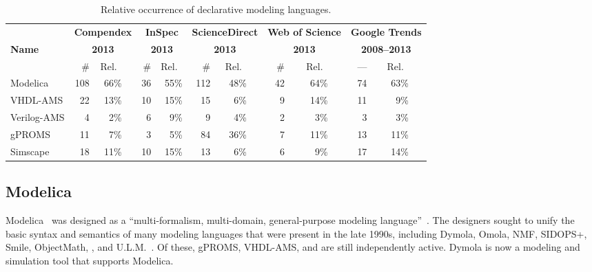 \captionsetup[table]{textformat=simple}
\begin{table}[hbtp]
  \caption[Relative occurrence of declarative modeling languages]{Relative occurrence of declarative modeling languages.\footnotemark}
  \label{tab:Languages}
  \begin{tabular}{l rrr rr rrr rrr rrr}
    \toprule
     & \multicolumn{3}{c}{\textbf{Compendex}} & \multicolumn{2}{c}{\textbf{InSpec}} & \multicolumn{3}{c}{\textbf{ScienceDirect}} & \multicolumn{3}{c}{\textbf{Web of Science}} & \multicolumn{3}{c}{\textbf{Google Trends}} \\
    \textbf{Name} & \multicolumn{3}{c}{\textbf{2013}} & \multicolumn{2}{c}{\textbf{2013}} & \multicolumn{3}{c}{\textbf{2013}} & \multicolumn{3}{c}{\textbf{2013}} & \multicolumn{3}{c}{\textbf{2008--2013}} \\
    \cmidrule(lr){2-4} \cmidrule(lr){5-6} \cmidrule(lr){7-9} \cmidrule(lr){10-12} \cmidrule(lr){13-15}
    & \# & Rel.\ && \# & Rel.\ & \# & Rel.\ && \# & Rel.\ && --- & Rel.\ \\
    \midrule
    Modelica & 108 & 66\% && 36 & 55\% & 112 & 48\% && 42 & 64\% && 74 & 63\% \\
    VHDL-AMS & 22 & 13\% && 10 & 15\% & 15 & 6\% && 9 & 14\% && 11 & 9\% \\
    Verilog-AMS & 4 & 2\% && 6 & 9\% & 9 & 4\% && 2 & 3\% && 3 & 3\% \\
    gPROMS & 11 & 7\% && 3 & 5\% & 84 & 36\% && 7 & 11\% && 13 & 11\% \\
    Simscape & 18 & 11\% && 10 & 15\% & 13 & 6\% && 6 & 9\% && 17 & 14\% \\
    \bottomrule
  \end{tabular}
\end{table}
\captionsetup[table]{textformat=period}


\subsection{Modelica}

Modelica~\cite{Modelica3.3} was designed as a ``multi-formalism, multi-domain, general-purpose modeling language''~\cite{Elmqvist1997}.  The designers sought to unify the basic syntax and semantics of many modeling languages that were present in the late 1990s, including Dymola, Omola, NMF, SIDOPS+, Smile, ObjectMath, , and U.L.M.~\cite{Elmqvist1997, Astrom1998}.  Of these, gPROMS, VHDL-AMS, and  are still independently active.  Dymola is now a modeling and simulation tool that supports Modelica.


